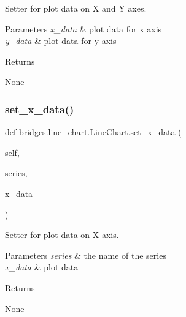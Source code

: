 Setter for plot data on X and Y axes. 


\begin{DoxyParams}{Parameters}
{\em x\+\_\+data} & plot data for x axis \\
\hline
{\em y\+\_\+data} & plot data for y axis \\
\hline
\end{DoxyParams}
\begin{DoxyReturn}{Returns}


None 
\end{DoxyReturn}
\mbox{\label{classbridges_1_1line__chart_1_1_line_chart_a74651645a41825887e8775a456176eac}} 
\subsubsection{\texorpdfstring{set\+\_\+x\+\_\+data()}{set\_x\_data()}}
{\footnotesize\ttfamily def bridges.\+line\+\_\+chart.\+Line\+Chart.\+set\+\_\+x\+\_\+data (\begin{DoxyParamCaption}\item[{}]{self,  }\item[{}]{series,  }\item[{}]{x\+\_\+data }\end{DoxyParamCaption})}



Setter for plot data on X axis. 


\begin{DoxyParams}{Parameters}
{\em series} & the name of the series \\
\hline
{\em x\+\_\+data} & plot data \\
\hline
\end{DoxyParams}
\begin{DoxyReturn}{Returns}


None 
\end{DoxyReturn}
\mbox{\label{classbridges_1_1line__chart_1_1_line_chart_ae5988ed81be128f96d63526560c61d9f}} 

